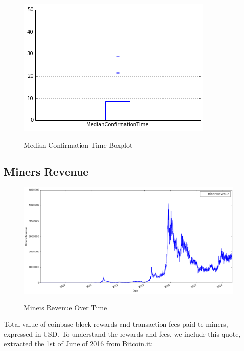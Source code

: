 \begin{figure}[bth]
  \myfloatalign
  {\includegraphics[width=1\linewidth]
    {gfx/median-confirmation-time-boxplot}}
  \caption{Median Confirmation Time Boxplot}
  \label{fig:median-confirmation-time-boxplot}
\end{figure}

\clearpage

\subsection{Miners Revenue}
\label{sec:miners-revenue}

\begin{figure}[bth]
  \myfloatalign
  {\includegraphics[width=1\linewidth]
    {gfx/miners-revenue-over-time}}
  \caption{Miners Revenue Over Time}
  \label{fig:miners-revenue-over-time}
\end{figure}

Total value of coinbase block rewards and transaction fees paid to
miners, expressed in USD. To understand the rewards and fees, we
include this quote, extracted the 1st of June of 2016 from
\href{https://en.bitcoin.it/wiki/Mining}{Bitcoin.it}:

